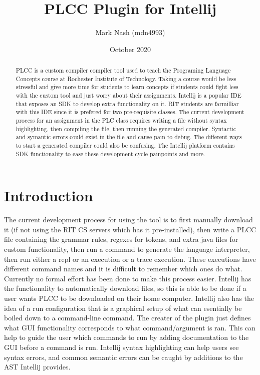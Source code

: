 \documentclass[12pt]{article}
\title{PLCC Plugin for Intellij}
\author{Mark Nash (mdn4993)}
\date{October 2020}
\begin{document}
{\selectfont
\maketitle

\begin{abstract}
    PLCC\cite{plcc-paper} is a custom compiler compiler tool used to teach the Programing Language Concepts course at Rochester Institute of Technology.
    Taking a course would be less stressful and give more time for students to learn concepts if students could fight less with the custom tool and just worry about their assignments.
    Intellij is a popular IDE that exposes an SDK to develop extra functionality on it.
    RIT students are farmilliar with this IDE since it is prefered for two pre-requisite classes.
    The current development process for an assignment in the PLC class requires writing a file without syntax highlighting, then compiling the file, then running the generated compiler.
    Syntactic and symantic errors could exist in the file and cause pain to debug.
    The different ways to start a generated compiler could also be confusing.
    The Intellij platform contains SDK functionality to ease these development cycle painpoints and more.
\end{abstract}

\section{Introduction}
The current development process for using the tool is to first manually download it (if not using the RIT CS servers which has it pre-installed), then write a PLCC file containing the grammar rules, regexes for tokens, and extra java files for custom functionality, then run a command to generate the language interpreter, then run either a repl or an execution or a trace execution.
These executions have different command names and it is difficult to remember which ones do what.
Currently no formal effort has been done to make this process easier.
Intellij has the functionality to automatically download files, so this is able to be done if a user wants PLCC to be downloaded on their home computer.
Intellij also has the idea of a run configuration that is a graphical setup of what can esentially be boiled down to a command-line command.
The creater of the plugin just defines what GUI functionality corresponds to what command/argument is ran.
This can help to guide the user which commands to run by adding documentation to the GUI before a command is run.
Intellij syntax highlighting can help users see syntax errors, and common semantic errors can be caught by additions to the AST Intellij provides.

}
\end{document}
